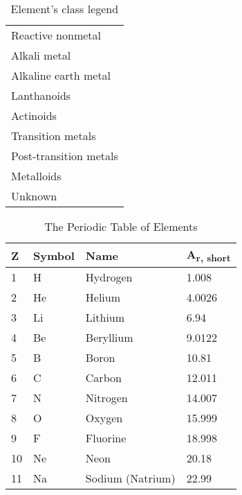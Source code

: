 \documentclass{article}
\begin{document}
\begin{center}
            \begin{longtable}{l}
            \caption{Element's class legend} \label{tab: the-color-legend} \\
            \endfirsthead
            \endhead
            \cellcolor{rnmgreen}Reactive nonmetal\\ 
            \cellcolor{alkalibeige}Alkali metal\\ 
            \cellcolor{alkalineyellow}Alkaline earth metal\\ 
            \cellcolor{lanthorange}Lanthanoids\\ 
            \cellcolor{actipink}Actinoids\\ 
            \cellcolor{transred}Transition metals\\ 
            \cellcolor{postblue}Post-transition metals\\ 
            \cellcolor{metalloid}Metalloids\\ 
            \cellcolor{unk}Unknown\\ 
            \end{longtable}
\begin{longtable}{|l|l|l|l|}
\caption{The Periodic Table of Elements} \label{tab: the-ptable} \\
\hline
    Z & Symbol & Name & A\textsubscript{r, short}\\
\hline
\endfirsthead
\endhead
    1 & H & \cellcolor{rnmgreen}Hydrogen & 1.008\\
 \hline
    2 & He & \cellcolor{noblepink}Helium & 4.0026\\
 \hline
 \hline
    3 & Li & \cellcolor{alkalibeige}Lithium & 6.94\\
 \hline
    4 & Be & \cellcolor{alkalineyellow}Beryllium & 9.0122\\
 \hline
    5 & B & \cellcolor{metalloid}Boron & 10.81\\
 \hline
    6 & C &\cellcolor{rnmgreen}Carbon & 12.011\\
 \hline
    7 & N &\cellcolor{rnmgreen}Nitrogen & 14.007\\
 \hline
    8 & O &\cellcolor{rnmgreen}Oxygen & 15.999\\
 \hline
    9 & F &\cellcolor{rnmgreen}Fluorine & 18.998\\
 \hline
    10 & Ne &\cellcolor{noblepink}Neon & 20.18\\
 \hline
 \hline
    11 & Na & \cellcolor{alkalibeige}Sodium (Natrium) & 22.99\\
 \hline

\end{longtable}
\end{center}
\end{document}
